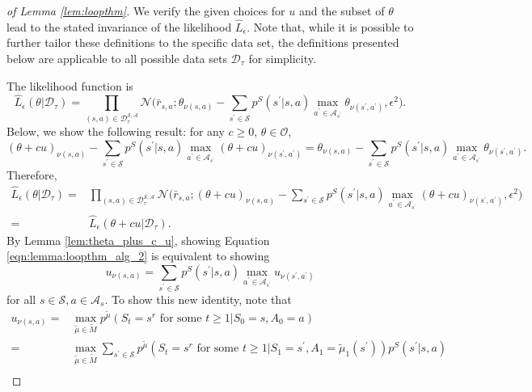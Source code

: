\documentclass{amsart}
\begin{document}
\begin{proof}[of Lemma \ref{lem:loopthm}]
We verify the given choices for $u$ and the subset of $\theta$ lead to the stated invariance of the likelihood $\hat{L}_{\epsilon}$. Note that, while it is possible to further tailor these definitions to the specific data set, the definitions presented below are applicable to all possible data sets $\mathcal{D}_\tau$ for simplicity.\newline

The likelihood function is
$$ \hat{L}_\epsilon(\theta|\mathcal{D}_\tau) = \prod_{(s,a) \in \mathcal{D}_\tau^{\mathcal{S},\mathcal{A}}} \mathcal{N}\Big(\bar{r}_{s,a};\theta_{\nu(s,a)} - \sum_{s^\prime \in \mathcal{S}} p^S(s^\prime|s,a) \max_{a^\prime \in \mathcal{A}_{s^\prime}} \theta_{\nu(s^\prime,a^\prime)}, \epsilon^2\Big).$$
Below, we show the following result: for any $c \geq 0$, $\theta \in \mathcal{O}$, 
\begin{equation}
(\theta + cu)_{\nu(s,a)} - \sum_{s^\prime \in \mathcal{S}} p^S(s^\prime|s,a) \max_{a^\prime \in \mathcal{A}_{s^\prime}} (\theta + cu)_{\nu(s^\prime, a^\prime)} = \theta_{\nu(s,a)} - \sum_{s^\prime \in \mathcal{S}} p^S(s^\prime|s,a) \max_{a^\prime \in \mathcal{A}_{s^\prime}} \theta_{\nu(s^\prime, a^\prime)}.
\label{eqn:lemma:loopthm_alg_2}
\end{equation}
Therefore, 
\begin{align*}
    \hat{L}_\epsilon(\theta|\mathcal{D}_\tau) =& \prod_{(s,a) \in \mathcal{D}_\tau^{\mathcal{S},\mathcal{A}}} \mathcal{N}\Big(\bar{r}_{s,a};(\theta + cu)_{\nu(s,a)} - \sum_{s^\prime \in \mathcal{S}} p^S(s^\prime|s,a) \max_{a^\prime \in \mathcal{A}_{s^\prime}} (\theta + cu)_{\nu(s^\prime, a^\prime)}, \epsilon^2 \Big) \\
    =& \hat{L}_\epsilon(\theta+cu|\mathcal{D}_\tau).
\end{align*}
\newline By Lemma \ref{lem:theta_plus_c_u}, showing Equation \ref{eqn:lemma:loopthm_alg_2} is equivalent to showing 
$$u_{\nu(s,a)} = \sum_{s^\prime \in \mathcal{S}} p^S(s^\prime|s,a) \max_{a^\prime \in \mathcal{A}_{s^\prime}} u_{\nu(s^\prime, a^\prime)}$$ for all $s \in \mathcal{S}, a \in \mathcal{A}_s$. To show this new identity, note that 
\begin{align*}
u_{\nu(s,a)} =& \max_{\tilde{\mu} \in \widetilde{M}} p^{\tilde{\mu}} (S_t=s^r \text{ for some } t \geq 1 | S_0=s, A_0=a) \\
=& \max_{\tilde{\mu} \in \widetilde{M}} \sum_{s^\prime \in \mathcal{S}} p^{\tilde{\mu}}(S_t=s^r \text{ for some } t \geq 1 | S_1=s^\prime, A_1 = \tilde{\mu}_1(s^\prime)) p^S(s^\prime|s,a) \\

\end{align*}
\end{proof}
\end{document}
